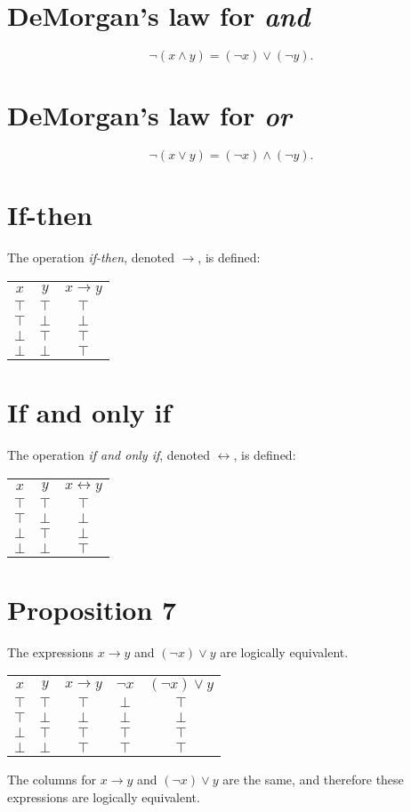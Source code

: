 \documentclass[12pt]{article}
\begin{document}
\section*{DeMorgan's law for \textit{and}}
\[\lnot(x\land y)=(\lnot x)\lor(\lnot y).\]
\section*{DeMorgan's law for \textit{or}}
\[\lnot(x\lor y)=(\lnot x)\land(\lnot y).\]
\section*{If-then}
The operation \textit{if-then}, denoted $\rightarrow$, is defined:
\begin{center}
\begin{tabular}{c|c||c}
$x$&$y$&$x\rightarrow y$\\
$\top$&$\top$&$\top$\\
$\top$&$\bot$&$\bot$\\
$\bot$&$\top$&$\top$\\
$\bot$&$\bot$&$\top$
\end{tabular}
\end{center}
\section*{If and only if}
The operation \textit{if and only if}, denoted $\leftrightarrow$, is defined:
\begin{center}
\begin{tabular}{c|c||c}
$x$&$y$&$x\leftrightarrow y$\\
$\top$&$\top$&$\top$\\
$\top$&$\bot$&$\bot$\\
$\bot$&$\top$&$\bot$\\
$\bot$&$\bot$&$\top$
\end{tabular}
\end{center}
\section*{Proposition 7}
The expressions $x\rightarrow y$ and $(\lnot x)\lor y$ are logically equivalent.
\begin{center}
\begin{tabular}{c|c|c|c|c}
$x$&$y$&$x\rightarrow y$&$\lnot x$&$(\lnot x)\lor y$\\
$\top$&$\top$&$\top$&$\bot$&$\top$\\
$\top$&$\bot$&$\bot$&$\bot$&$\bot$\\
$\bot$&$\top$&$\top$&$\top$&$\top$\\
$\bot$&$\bot$&$\top$&$\top$&$\top$
\end{tabular}
\end{center}
The columns for $x\rightarrow y$ and $(\lnot x)\lor y$ are the same, and therefore these expressions are logically equivalent.
\end{document}
